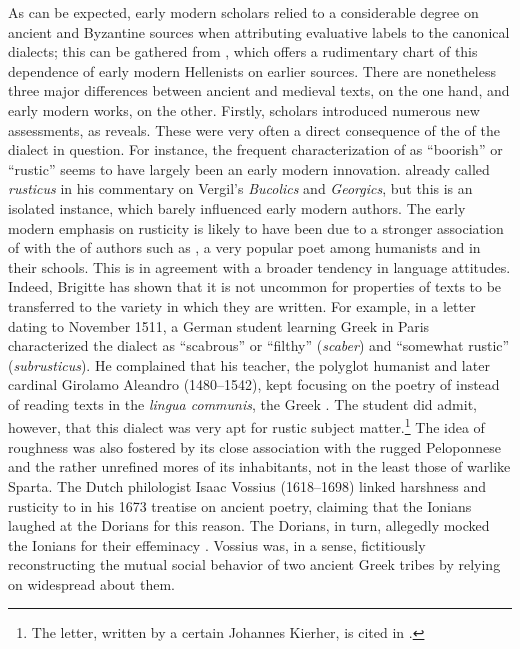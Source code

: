 As can be expected, early modern scholars relied to a considerable degree on ancient and Byzantine sources when attributing evaluative labels to the canonical dialects; this can be gathered from , which offers a rudimentary chart of this dependence of early modern Hellenists on earlier sources. There are nonetheless three major differences between ancient and medieval texts, on the one hand, and early modern works, on the other. Firstly, scholars introduced numerous new assessments, as  reveals. These were very often a direct consequence of the  of the dialect in question. For instance, the frequent characterization of  as “boorish” or “rustic” seems to have largely been an early modern innovation.  already called  \textit{rusticus} in his commentary on Vergil’s \textit{Bucolics} and \textit{Georgics}, but this is an isolated instance, which barely influenced early modern authors. The early modern emphasis on  rusticity is likely to have been due to a stronger association of  with the  of authors such as , a very popular poet among humanists and in their schools. This is in agreement with a broader tendency in language attitudes. Indeed, Brigitte \citet{Schlieben-lange1992} has shown that it is not uncommon for properties of texts to be transferred to the variety in which they are written. For example, in a letter dating to November 1511, a German student learning Greek in Paris characterized the  dialect as “scabrous” or “filthy” (\textit{scaber}) and “somewhat rustic” (\textit{subrusticus}). He complained that his teacher, the polyglot humanist and later cardinal Girolamo Aleandro (1480–1542), kept focusing on the  poetry of  instead of reading texts in the \textit{lingua communis}, the Greek . The student did admit, however, that this dialect was very apt for rustic subject matter.\footnote{The letter, written by a certain Johannes Kierher, is cited in \citet[220 n.435; cf. also p. 103]{Botley2010}.} The idea of  roughness was also fostered by its close association with the rugged Peloponnese and the rather unrefined mores of its inhabitants, not in the least those of warlike Sparta. The Dutch philologist Isaac Vossius (1618–1698) linked harshness and rusticity to  in his 1673 treatise on ancient poetry, claiming that the Ionians laughed at the Dorians for this reason. The Dorians, in turn, allegedly mocked the Ionians for their effeminacy \citep[55]{Vossius1673}. Vossius was, in a sense, fictitiously reconstructing the mutual social behavior of two ancient Greek tribes by relying on widespread  about them.


